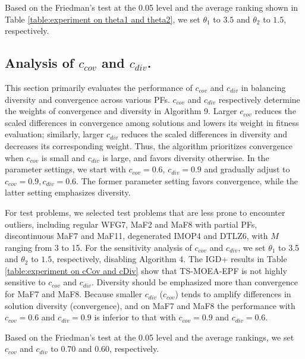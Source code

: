 \documentclass[a4paper,fleqn]{cas-dc}
\begin{document}
\begin{sloppypar}
	\par Based on the Friedman's test  at the 0.05 level and the average ranking shown in Table \ref{table:experiment on theta1 and theta2}, we set $\theta_1$ to $3.5$ and $\theta_2$ to $1.5$,  {respectively}. 
	
	\subsection{Analysis of $c_{cov}$  and  $c_{div}$.}
    \par This section primarily evaluates the performance of $c_{cov}$ and $c_{div}$ in balancing diversity and convergence across various PFs. $c_{cov}$ and $c_{div}$  respectively determine the weights of convergence and diversity in Algorithm 9. Larger $c_{cov}$ reduces the scaled differences in convergence among solutions and lowers its weight in fitness evaluation; similarly, larger $c_{div}$ reduces the scaled differences in diversity and decreases its corresponding weight. Thus, the algorithm prioritizes convergence when $c_{cov}$ is small and $c_{div}$ is large, and favors diversity otherwise. In the parameter settings,  we start with $c_{cov}=0.6$, ${c_{div}=0.9}$ and  gradually adjust to $c_{cov}=0.9, {c_{div}=0.6}$. The former parameter setting favors convergence, while the latter setting emphasizes diversity.
	\par  For test problems, we selected test problems that are less prone to encounter outliers, including regular WFG7, MaF2 and MaF8 with partial PFs, discontinuous MaF7 and MaF11, degenerated IMOP4 and DTLZ6, with $M$ ranging from 3 to 15. For the sensitivity analysis of  $c_{cov}$ and  $c_{div}$, we set  $\theta_1$ to 3.5 and $\theta_2$ to $1.5$,  respectively, disabling Algorithm {4}. The IGD+ results in Table \ref{table:experiment on cCov and cDiv} show that {TS-MOEA-EPF} is not highly sensitive to $c_{cov}$ and  $c_{div}$.   Diversity should be emphasized more than convergence for MaF7 and MaF8. Because smaller  $c_{div}$ ($c_{cov}$) tends to amplify differences in solution diversity (convergence), and on MaF7 and MaF8 the performance with $c_{cov}=0.6$ and $c_{div}=0.9$  is inferior to that with $c_{cov}=0.9$ and $c_{div}=0.6$. 
	\par Based on the Friedman's test at the 0.05 level and the average rankings, we set {$c_{cov}$} and {$c_{div}$} to 0.70 and 0.60, respectively.
	

\end{sloppypar}
\end{document}
